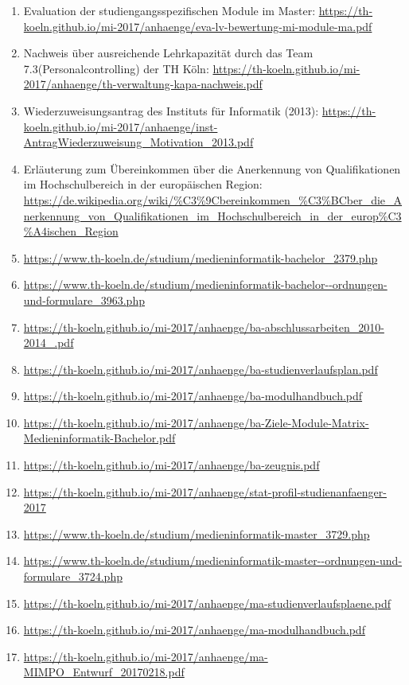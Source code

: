 \documentclass[BCOR12mm,DIV11,titlepage,a4paper,oneside,10pt]{scrbook}
\begin{document}
\begin{sloppypar}
\begin{flushleft}
\begin{enumerate}
\item{Evaluation der studiengangsspezifischen Module im Master: \url{https://th-koeln.github.io/mi-2017/anhaenge/eva-lv-bewertung-mi-module-ma.pdf} } 
\item{Nachweis über ausreichende Lehrkapazität durch das Team 7.3(Personalcontrolling) der TH Köln: \url{https://th-koeln.github.io/mi-2017/anhaenge/th-verwaltung-kapa-nachweis.pdf} } 
\item{Wiederzuweisungsantrag des Instituts für Informatik (2013): \url{https://th-koeln.github.io/mi-2017/anhaenge/inst-AntragWiederzuweisung\_Motivation\_2013.pdf} } 
\item{Erläuterung zum Übereinkommen über die Anerkennung von Qualifikationen im Hochschulbereich in der europäischen Region: \url{https://de.wikipedia.org/wiki/\%C3\%9Cbereinkommen\_\%C3\%BCber\_die\_Anerkennung\_von\_Qualifikationen\_im\_Hochschulbereich\_in\_der\_europ\%C3\%A4ischen\_Region} } 
\item{\url{https://www.th-koeln.de/studium/medieninformatik-bachelor\_2379.php}} 
\item{\url{https://www.th-koeln.de/studium/medieninformatik-bachelor--ordnungen-und-formulare\_3963.php}} 
\item{\url{https://th-koeln.github.io/mi-2017/anhaenge/ba-abschlussarbeiten\_2010-2014\_.pdf}} 
\item{\url{https://th-koeln.github.io/mi-2017/anhaenge/ba-studienverlaufsplan.pdf}} 
\item{\url{https://th-koeln.github.io/mi-2017/anhaenge/ba-modulhandbuch.pdf}} 
\item{\url{https://th-koeln.github.io/mi-2017/anhaenge/ba-Ziele-Module-Matrix-Medieninformatik-Bachelor.pdf}} 
\item{\url{https://th-koeln.github.io/mi-2017/anhaenge/ba-zeugnis.pdf}} 
\item{\url{https://th-koeln.github.io/mi-2017/anhaenge/stat-profil-studienanfaenger-2017}} 
\item{\url{https://www.th-koeln.de/studium/medieninformatik-master\_3729.php}} 
\item{\url{https://www.th-koeln.de/studium/medieninformatik-master--ordnungen-und-formulare\_3724.php}} 
\item{\url{https://th-koeln.github.io/mi-2017/anhaenge/ma-studienverlaufsplaene.pdf}} 
\item{\url{https://th-koeln.github.io/mi-2017/anhaenge/ma-modulhandbuch.pdf}} 
\item{\url{https://th-koeln.github.io/mi-2017/anhaenge/ma-MIMPO\_Entwurf\_20170218.pdf}} 

\end{enumerate}
\end{flushleft}
\end{sloppypar}
\end{document}
